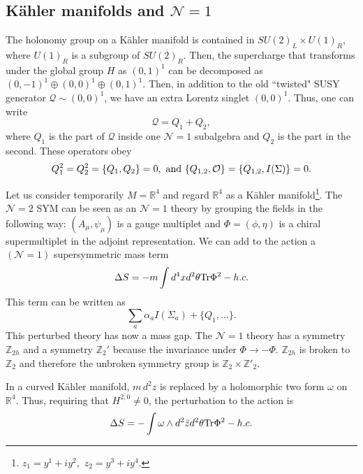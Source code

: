 \documentclass[12pt, onecolumn]{article}
\begin{document}
\subsection{K\"ahler manifolds and $\mathcal{N}=1$}

The holonomy group on a K\"ahler manifold is contained in $SU(2)_L\times U(1)_R$, where $U(1)_R$ is a subgroup of $SU(2)_R$.  Then, the supercharge that transforms under the global group $H$ as $(0,1)^1$ can be decomposed as $(0,-1)^1\oplus (0,0)^1\oplus(0,1)^1$. Then, in addition to the old ``twisted" SUSY generator  $\mathcal{Q}\sim (0,0)^1$, we have an extra Lorentz singlet $(0,0)^1$. Thus, one can write 
\begin{equation}
\mathcal{Q}=Q_1+Q_2,
\end{equation} where $Q_1$ is the part of $\mathcal{Q}$ inside one $\mathcal{N}=1$ subalgebra and $Q_2$ is the part in the second. These operators obey
\begin{equation}
Q_1^2=Q_2^2=\{Q_1, Q_2\}=0, \,\,{\rm and}\,\,\{Q_{1,2},\mathcal{O}\}=\{Q_{1,2},I(\Sigma)\}=0.
\end{equation}

Let us consider temporarily $M=\mathbb{R}^4$ and regard $\mathbb{R}^4$ as a K\"ahler manifold\footnote{$z_1=y^1+iy^2,\,\,z_2=y^3+iy^4.$}.  The $\mathcal{N}=2$ SYM can be seen as an $\mathcal{N}=1$ theory by grouping the fields in the following way: $(A_\mu,\psi_\mu)$ is a gauge multiplet and $\Phi=(\phi, \eta)$ is a chiral supermultiplet in the adjoint representation. We can add to the action a $(\mathcal{N}=1)$ supersymmetric mass term
\begin{equation}
\Delta S = -m\int d^4x d^2\theta {\rm Tr} \Phi^2 -h. c. \label{mass}
\end{equation}
This term can be written as 
\begin{equation}
\sum_a \alpha_a I(\Sigma_a)+\{Q_1,\ldots\}.
\end{equation}
This perturbed theory has now a mass gap. The $\mathcal{N}=1$ theory has a symmetry $\mathbb{Z}_{2h}$ and a symmetry $\mathbb{Z}_2'$ because the invariance under $\Phi\rightarrow -\Phi$. $\mathbb{Z}_{2h}$ is broken to $\mathbb{Z}_2$ and therefore the unbroken symmetry group is $\mathbb{Z}_2\times \mathbb{Z}'_2$. 

In a curved K\"ahler manifold, $m\,d^2z$ is replaced by a holomorphic two form $\omega$ on $\mathbb{R}^4$. Thus, requiring that $H^{2,0}\neq 0$, the perturbation to the action is 
\begin{equation}
\Delta S=-\int \omega \wedge d^2 \bar{z} d^2\theta {\rm Tr} \Phi^2 -h. c.
\end{equation}
\end{document}

